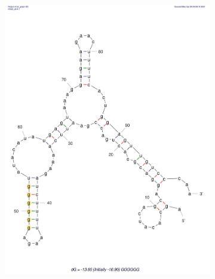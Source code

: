 \documentclass{scrartcl}[2013/05/29]%
\begin{document}
\begin{figure}[!ht]
    \centering
    \begin{subfigure}[b]{0.49\textwidth}
        \centering
        \includegraphics[scale=0.25]{plots/Supplementary/Structure_GGGGGG.pdf}
        \label{fig:GGGGGG}
    \end{subfigure}
    \hfill
    \begin{subfigure}[b]{0.49\textwidth}
        \centering

\end{subfigure}
\end{figure}
\end{document}

